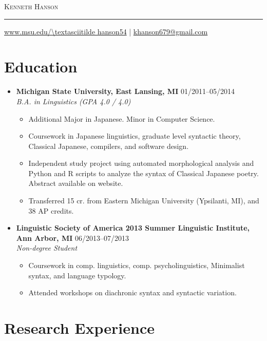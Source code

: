 \documentclass[10pt,oneside]{article}
\makeatletter
\newcommand{\name}{Kenneth Hanson}
\newcommand{\email}{khanson679@gmail.com}
\newcommand{\website}{www.msu.edu/\textasciitilde hanson54}
\newcommand{\bigname}{%
	{\centering\scshape\Huge \name \par}
}
\newcommand{\contactinfo}{%
	{\raggedleft\small \url{\website} | \href{mailto:\email}{\email} \par}
}
\newcommand{\topheading}{%
	\bigname
	\rule{\textwidth}{1pt} \par
	\contactinfo
}
\newcommand{\ressection}[1]{
	\vspace{-12pt}
	\section*{#1}
}
\newcommand{\resbigitem}[4]{
	\item
	\textbf{#1} \hfill #2 \\
	\textit{#3} \hfill \textit{#4}
}
\makeatother
\begin{document}
\topheading

\ressection{Education}

\begin{itemize}
	\resbigitem{Michigan State University, East Lansing, MI}
		{01/2011--05/2014}
		{B.A. in Linguistics (GPA 4.0 / 4.0)}
		{}
	\begin{itemize}
		\item{Additional Major in Japanese. Minor in Computer Science.}
		\item{Coursework in Japanese linguistics, graduate level syntactic theory, Classical Japanese, compilers, and software design.}
		\item{Independent study project using automated morphological analysis and Python and R scripts to analyze the syntax of Classical Japanese poetry. Abstract available on website.}
		\item{Transferred 15 cr. from Eastern Michigan University (Ypsilanti, MI), and 38 AP credits.}
	\end{itemize}
	
	\resbigitem{Linguistic Society of America 2013 Summer Linguistic Institute, Ann Arbor, MI}
		{06/2013--07/2013}
		{Non-degree Student}
		{}
	\begin{itemize}
		\item{Coursework in comp. linguistics, comp. psycholinguistics, Minimalist syntax, and language typology.}
		\item{Attended workshops on diachronic syntax and syntactic variation.}
	\end{itemize}
\end{itemize}


\ressection{Research Experience}
\end{document}

